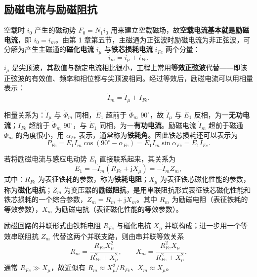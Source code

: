 \subsection{励磁电流与励磁阻抗}
空载时 $i_0$ 产生的磁动势 $F_0=N_1i_0$ 用来建立空载磁场，故\textbf{空载电流基本就是励磁电流}，即 $i_0=i_m$。由第 1 章第五节，主磁通为正弦波时励磁电流为非正弦波，可分解为产生主磁通的\textbf{磁化电流} $i_\mu$ 与\textbf{铁芯损耗电流} $i_{Fe}$ 两个分量：
\begin{equation}
i_m=i_\mu+i_{Fe}.
\end{equation}
$i_\mu$ 是尖顶波，其数值与额定电流相比很小，工程上常用\textbf{等效正弦波}代替——即该正弦波的有效值、频率和相位都与尖顶波相同。经过等效后，励磁电流可以用相量表示：
\begin{equation}
\dot I_m=\dot I_\mu+\dot I_{Fe}.
\end{equation}

相量关系为：$\dot I_\mu$ 与 $\dot\Phi_m$ 同相，$\dot E_1$ 超前于 $\dot\Phi_m$ $90^\circ$，故 $\dot I_\mu$ 与 $\dot E_1$ 反相，为一\textbf{无功电流}；$\dot I_{Fe}$ 超前于 $\dot\Phi_m$ $90^\circ$，与 $\dot E_1$ 同相，为一\textbf{有功电流}。励磁电流 $\dot I_m$ 超前于磁通 $\dot\Phi_m$ 的角度很小，用 $\alpha_{Fe}$ 表示，通常称为\textbf{铁耗角}。因此铁芯损耗还可以表示为
\begin{equation}
P_{Fe}=E_1I_m\cos\!\left(90^\circ-\alpha_{Fe}\right)=E_1I_m\sin\alpha_{Fe}=E_1I_{Fe}.
\end{equation}

若将励磁电流与感应电动势 $E_1$ 直接联系起来，其关系为
\begin{equation}
\dot E_1=-\dot I_m\left(R_{Fe}+\mathrm{j}X_\mu\right)=-\dot I_mZ_m,
\end{equation}
式中：$R_{Fe}$ 为表征铁耗的参数，称为\textbf{铁耗电阻}；$X_\mu$ 为表征铁芯磁化性能的参数，称为\textbf{磁化电抗}；$Z_m$ 为变压器的\textbf{励磁阻抗}，是用串联阻抗形式表征铁芯磁化性能和铁芯损耗的一个综合参数，$Z_m=R_m+\mathrm{j}X_m$。其中 $R_m$ 为励磁电阻（表征铁耗的等效参数），$X_m$ 为励磁电抗（表征磁化性能的等效参数）。

励磁回路的并联形式由铁耗电阻 $R_{Fe}$ 与磁化电抗 $X_\mu$ 并联构成；进一步用一个等效串联阻抗 $Z_m$ 代替这两个并联支路，则由串并联等效关系
\begin{equation}
R_m=\frac{R_{Fe}X_\mu^{2}}{R_{Fe}^{2}+X_\mu^{2}},\qquad
X_m=\frac{R_{Fe}^{2}X_\mu}{R_{Fe}^{2}+X_\mu^{2}} .
\end{equation}
通常 $R_{Fe}\gg X_\mu$，故近似有 $R_m\approx X_\mu^{2}/R_{Fe}$、$X_m\approx X_\mu$。

